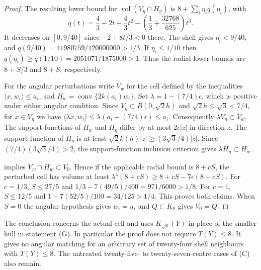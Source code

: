 \begin{proof}
The resulting lower bound for $\operatorname{vol}(V_\eta\cap H_\eta)$
is $8+\sum_i\eta_i q(\eta_i)$, with
\[
 q(t)=\frac43-2t+\frac43t^2
      -\left(\frac13+\frac{32768}{625}\right)t^3.
\]
It decreases on $[0,9/40]$ since $-2+8t/3<0$ there.
The shell gives $\eta_i<9/40$,
and $q(9/40)=41980759/120000000>1/3$.
If $\eta_i\le1/10$ then
$q(\eta_i)\ge q(1/10)=2051071/1875000>1$.
Thus the radial lower bounds are $8+S/3$ and $8+S$, respectively.

For the angular perturbations write $V_w$ for the cell defined by the
inequalities $\langle x,w_i\rangle\le a_i$, and
$H_w=\operatorname{conv}\{2k(a_i)w_i\}$. Set
$\lambda=1-(7/4)\epsilon$, which is positive under either angular
condition. Since $V_\eta\subset B(0,\sqrt2h)$ and
$\sqrt2h\le\sqrt3<7/4$, for $x\in V_\eta$ we have
$\langle\lambda x,w_i\rangle\le\lambda(a_i+(7/4)\epsilon)\le a_i$.
Consequently $\lambda V_\eta\subset V_w$.
The support functions of $H_w$ and $H_\eta$ differ by at most
$2\epsilon|z|$ in direction $z$. The support function of $H_\eta$ is
at least $\sqrt2 k(h)|z|\ge(3\sqrt3/4)|z|$. Since
$(7/4)(3\sqrt3/4)>2$, the support-function inclusion criterion gives
$\lambda H_\eta\subset H_w$.

 implies $V_w\cap H_w\subset V_0$.
Hence if the applicable radial bound
is $8+cS$, the perturbed cell has volume at least
$\lambda^4(8+cS)\ge 8+cS-7\epsilon(8+cS)$.
For $c=1/3$, $S\le27/5$ and
$1/3-7(49/5)/400=971/6000>1/8$.
For $c=1$, $S\le12/5$ and $1-7(52/5)/100=34/125>1/4$.
This proves both claims. When $S=0$ the angular hypothesis gives
$w_i=u_i$ and $Q\subset K_0$ gives $V_0=Q$.
\end{proof}

\begin{remark}
The conclusion concerns the actual cell and uses $K_{\sqrt6}(Y)$ in place
of the smaller hull in statement (G). In particular the proof does not
require $T(Y)\le8$. It gives no angular matching for an arbitrary set
of twenty-four shell neighbours with $T(Y)\le8$. The untreated
twenty-five- to twenty-seven-centre cases of (C) also remain.
\end{remark}
